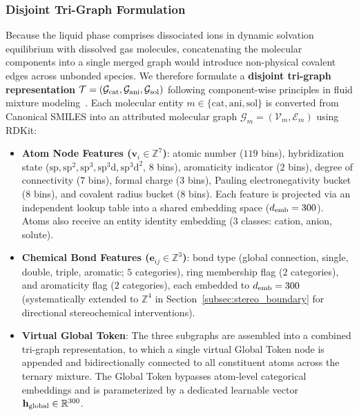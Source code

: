 \subsubsection{Disjoint Tri-Graph Formulation}
Because the liquid phase comprises dissociated ions in dynamic solvation equilibrium with dissolved gas molecules, concatenating the molecular components into a single merged graph would introduce non-physical covalent edges across unbonded species. We therefore formulate a \textbf{disjoint tri-graph representation} $\mathcal{T} = (\mathcal{G}_{\rm cat}, \mathcal{G}_{\rm ani}, \mathcal{G}_{\rm sol})$ following component-wise principles in fluid mixture modeling~\cite{Chu2024_AEGNN,Wu2018_MoleculeNet,Schwaller2024_3DGeom}. Each molecular entity $m \in \{\text{cat}, \text{ani}, \text{sol}\}$ is converted from Canonical SMILES into an attributed molecular graph $\mathcal{G}_m = (\mathcal{V}_m, \mathcal{E}_m)$ using RDKit:
\begin{itemize}
    \item \textbf{Atom Node Features ($\mathbf{v}_i \in \mathbb{Z}^{7}$)}: atomic number ($119$ bins), hybridization state ($\text{sp}, \text{sp}^2, \text{sp}^3, \text{sp}^3\text{d}, \text{sp}^3\text{d}^2$, $8$ bins), aromaticity indicator ($2$ bins), degree of connectivity ($7$ bins), formal charge ($3$ bins), Pauling electronegativity bucket ($8$ bins), and covalent radius bucket ($8$ bins). Each feature is projected via an independent lookup table into a shared embedding space ($d_{\rm emb} = 300$). Atoms also receive an entity identity embedding ($3$ classes: cation, anion, solute).
    \item \textbf{Chemical Bond Features ($\mathbf{e}_{ij} \in \mathbb{Z}^{3}$)}: bond type (global connection, single, double, triple, aromatic; $5$ categories), ring membership flag ($2$ categories), and aromaticity flag ($2$ categories), each embedded to $d_{\rm emb} = 300$ (systematically extended to $\mathbb{Z}^4$ in Section~\ref{subsec:stereo_boundary} for directional stereochemical interventions).
    \item \textbf{Virtual Global Token}: The three subgraphs are assembled into a combined tri-graph representation, to which a single virtual Global Token node is appended and bidirectionally connected to all constituent atoms across the ternary mixture. The Global Token bypasses atom-level categorical embeddings and is parameterized by a dedicated learnable vector $\mathbf{h}_{\rm global} \in \mathbb{R}^{300}$.
\end{itemize}

